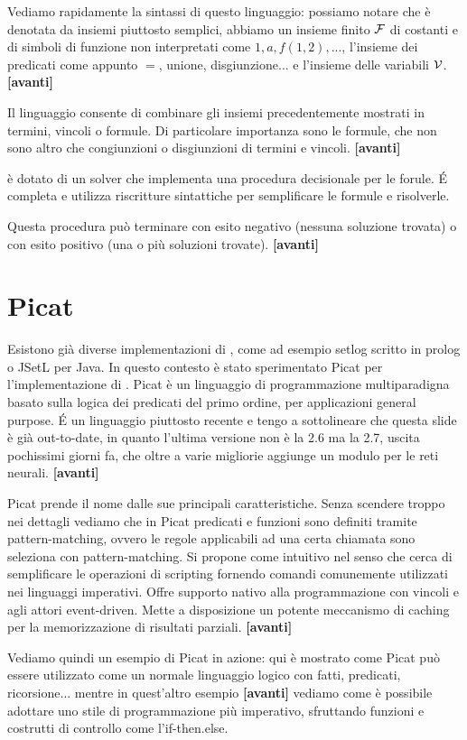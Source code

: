 \documentclass[11pt]{article}
\newcommand*{\nextslide}{\textbf{[avanti]}}
\begin{document}
Vediamo rapidamente la sintassi di questo linguaggio: possiamo notare
che è denotata da insiemi piuttosto semplici, abbiamo un insieme
finito $\mathcal{F}$ di costanti e di simboli di funzione non interpretati
come $1, a, f(1,2), ...$, l'insieme dei predicati come appunto $=$,
unione, disgiunzione... e l'insieme delle variabili
$\mathcal{V}$. \nextslide{}

Il linguaggio consente di combinare gli insiemi precedentemente
mostrati in termini, vincoli o formule. Di particolare importanza sono
le formule, che non sono altro che congiunzioni o disgiunzioni di
termini e vincoli. \nextslide{}

\lset{} è dotato di un solver che implementa una procedura decisionale
per le forule. \'E completa e utilizza riscritture sintattiche per
semplificare le formule e risolverle.

Questa procedura può terminare con esito negativo (nessuna soluzione
trovata) o con esito positivo (una o più soluzioni trovate).
\nextslide{}

\section*{Picat}

Esistono già diverse implementazioni di \lset{}, come ad esempio
setlog scritto in prolog o JSetL per Java. In questo contesto è stato
sperimentato Picat per l'implementazione di \lset{}. Picat è un
linguaggio di programmazione multiparadigna basato sulla logica dei
predicati del primo ordine, per applicazioni general purpose. \'E un
linguaggio piuttosto recente e tengo a sottolineare che questa slide è
già out-to-date, in quanto l'ultima versione non è la 2.6 ma la 2.7,
uscita pochissimi giorni fa, che oltre a varie migliorie aggiunge un
modulo per le reti neurali. \nextslide{}

Picat prende il nome dalle sue principali caratteristiche. Senza
scendere troppo nei dettagli vediamo che in Picat predicati e funzioni
sono definiti tramite pattern-matching, ovvero le regole applicabili
ad una certa chiamata sono seleziona con pattern-matching. Si propone
come intuitivo nel senso che cerca di semplificare le operazioni di
scripting fornendo comandi comunemente utilizzati nei linguaggi
imperativi. Offre supporto nativo alla programmazione con vincoli e
agli attori event-driven. Mette a disposizione un potente meccanismo
di caching per la memorizzazione di risultati parziali. \nextslide{}

Vediamo quindi un esempio di Picat in azione: qui è mostrato come
Picat può essere utilizzato come un normale linguaggio logico con
fatti, predicati, ricorsione... mentre in quest'altro esempio
\nextslide{} vediamo come è possibile adottare uno stile di
programmazione più imperativo, sfruttando funzioni e costrutti di
controllo come l'if-then.else.
\end{document}
